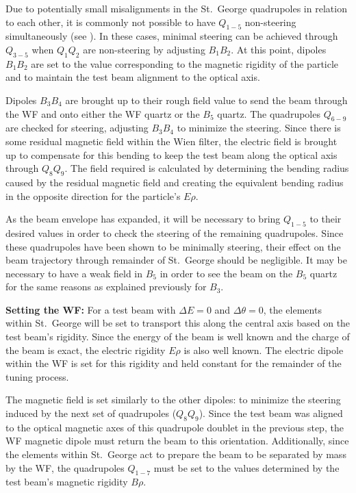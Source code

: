 Due to potentially small misalignments in the St.\ George quadrupoles in
relation to each other, it is commonly not possible to have $Q_{1-5}$
non-steering simultaneously (see \cite{Meisel2017}). In these cases, minimal
steering can be achieved through $Q_{3-5}$ when $Q_1Q_2$ are non-steering by
adjusting $B_1B_2$. At this point, dipoles $B_1B_2$ are set to the value
corresponding to the magnetic rigidity of the particle and to maintain the
test beam alignment to the optical axis.

Dipoles $B_3B_4$ are brought up to their rough field value to send the beam
through the WF and onto either the WF quartz or the $B_5$ quartz. The
quadrupoles $Q_{6-9}$ are checked for steering, adjusting $B_3B_4$ to minimize
the steering. Since there is some residual magnetic field within the Wien
filter, the electric field is brought up to compensate for this bending to keep
the test beam along the optical axis through $Q_8Q_9$. The field required is
calculated by determining the bending radius caused by the residual magnetic
field and creating the equivalent bending radius in the opposite direction for
the particle's $E\rho$.

As the beam envelope has expanded, it will be necessary to bring $Q_{1-5}$ to
their desired values in order to check the steering of the remaining
quadrupoles. Since these quadrupoles have been shown to be minimally steering,
their effect on the beam trajectory through remainder of St.\ George should be
negligible. It may be necessary to have a weak field in $B_5$ in order to see
the beam on the $B_5$ quartz for the same reasons as explained previously for
$B_3$.

\textbf{Setting the WF:}
For a test beam with $\Delta E = 0$ and $\Delta\theta = 0$, the elements within
St.\ George will be set to transport this along the central axis based on the
test beam's rigidity. Since the energy of the beam is well known and the charge
of the beam is exact, the electric rigidity $E\rho$ is also well known. The
electric dipole within the WF is set for this rigidity and held
constant for the remainder of the tuning process.

The magnetic field is set similarly to the other dipoles: to minimize the
steering induced by the next set of quadrupoles ($Q_8Q_9$). Since the test beam
was aligned to the optical magnetic axes of this quadrupole doublet in the
previous step, the WF magnetic dipole must return the beam to this
orientation. Additionally, since the elements within St.\ George act to
prepare the beam to be separated by mass by the WF, the quadrupoles
$Q_{1-7}$ must be set to the values determined by the test beam's magnetic
rigidity $B\rho$.

